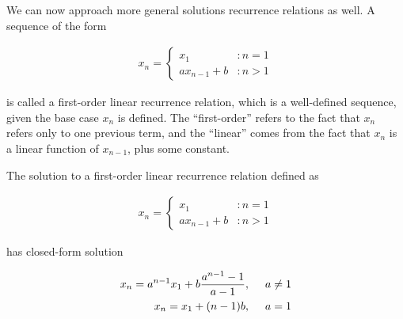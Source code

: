 \documentclass[twoside]{report}
\begin{document}
We can now approach more general solutions recurrence relations as well. A sequence of the form

\begin{align*}
	x_n =
	\begin{cases}
		x_1 &: n = 1 \\
		a x_{n - 1} + b &: n > 1
	\end{cases}
\end{align*}

is called a first-order linear recurrence relation, which is a well-defined sequence, given the base case $x_n$ is defined. The ``first-order'' refers to the fact that $x_n$ refers only to one previous term, and the ``linear'' comes from the fact that $x_n$ is a linear function of $x_{n - 1}$, plus some constant.

\vspace{\baselineskip}
\begin{theorem}
	The solution to a first-order linear recurrence relation defined as
	
	\begin{align*}
		x_n =
		\begin{cases}
			x_1 &: n = 1 \\
			a x_{n - 1} + b &: n > 1
		\end{cases}
	\end{align*}
	
	has closed-form solution
	
	\begin{align*}
		x_n = a^{n - 1} x_1 + b \frac{a^{n - 1} - 1}{a - 1}, & \hspace{\baselineskip} a \neq 1 \\
		x_n = x_1 + (n - 1)b, &\hspace{\baselineskip} a =  1
	\end{align*}
\end{theorem}
\end{document}
